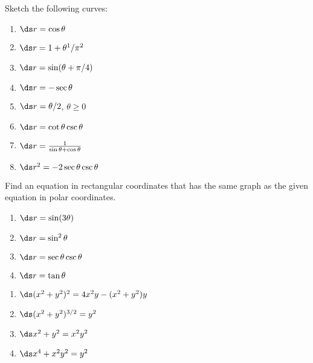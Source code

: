 \begin{enumialphparenastyle}
\begin{ex}
Sketch the following curves:
\begin{multicols}{2}
\begin{enumerate}
	\item	$\ds r=\cos\theta$
	\item	$\ds r=1+\theta^1/\pi^2$
	\item	$\ds r=\sin(\theta+\pi/4)$
	\item	$\ds r=-\sec\theta$
	\item	$\ds r=\theta/2$, $\theta\ge0$
	\item	$\ds r=\cot\theta\csc\theta$
	\item	$\ds r={1\over\sin\theta+\cos\theta}$
	\item	$\ds r^2=-2\sec\theta\csc\theta$
\end{enumerate}
\end{multicols}
\end{ex}

\begin{ex}
Find an equation in rectangular coordinates that has the same
graph as the given equation in polar coordinates.
\begin{multicols}{2}
\begin{enumerate}
	\item	$\ds r=\sin(3\theta)$
	\item	$\ds r=\sin^2\theta$
	\item	$\ds r=\sec\theta\csc\theta$
	\item	$\ds r=\tan\theta$
\end{enumerate}
\end{multicols}
\begin{sol}
\begin{multicols}{2}
\begin{enumerate}
	\item	$\ds (x^2+y^2)^2=4x^2y-(x^2+y^2)y$
	\item	$\ds (x^2+y^2)^{3/2}=y^2$
	\item	$\ds x^2+y^2=x^2y^2$
	\item	$\ds x^4+x^2y^2=y^2$
\end{enumerate}
\end{multicols}
\end{sol}
\end{ex}

\end{enumialphparenastyle}